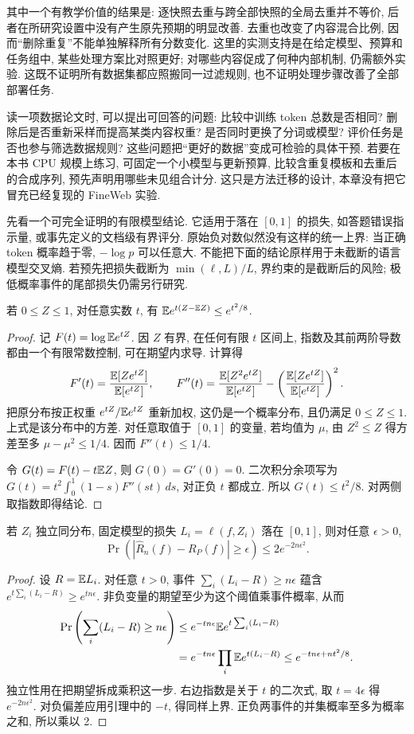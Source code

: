 其中一个有教学价值的结果是: 逐快照去重与跨全部快照的全局去重并不等价, 后者在所研究设置中没有产生原先预期的明显改善. 去重也改变了内容混合比例, 因而“删除重复”不能单独解释所有分数变化. 这里的实测支持是在给定模型、预算和任务组中, 某些处理方案比对照更好; 对哪些内容促成了何种内部机制, 仍需额外实验. 这既不证明所有数据集都应照搬同一过滤规则, 也不证明处理步骤改善了全部部署任务.

读一项数据论文时, 可以提出可回答的问题: 比较中训练 token 总数是否相同? 删除后是否重新采样而提高某类内容权重? 是否同时更换了分词或模型? 评价任务是否也参与筛选数据规则? 这些问题把“更好的数据”变成可检验的具体干预. 若要在本书 CPU 规模上练习, 可固定一个小模型与更新预算, 比较含重复模板和去重后的合成序列, 预先声明用哪些未见组合计分. 这只是方法迁移的设计, 本章没有把它冒充已经复现的 FineWeb 实验.

先看一个可完全证明的有限模型结论. 它适用于落在 $[0,1]$ 的损失, 如答题错误指示量, 或事先定义的文档级有界评分. 原始负对数似然没有这样的统一上界: 当正确 token 概率趋于零, $-\log p$ 可以任意大. 不能把下面的结论原样用于未截断的语言模型交叉熵. 若预先把损失截断为 $\min(\ell,L)/L$, 界约束的是截断后的风险; 极低概率事件的尾部损失仍需另行研究.

\begin{lemma}[有界随机变量的指数估计]
若 $0\le Z\le1$, 对任意实数 $t$, 有 $\mathbb E e^{t(Z-\mathbb E Z)}\le e^{t^2/8}$.
\end{lemma}
\begin{proof}
记 $F(t)=\log\mathbb E e^{tZ}$. 因 $Z$ 有界, 在任何有限 $t$ 区间上, 指数及其前两阶导数都由一个有限常数控制, 可在期望内求导. 计算得
\[
F'(t)=\frac{\mathbb E[Ze^{tZ}]}{\mathbb E[e^{tZ}]},\qquad
F''(t)=\frac{\mathbb E[Z^2e^{tZ}]}{\mathbb E[e^{tZ}]}-
\left(\frac{\mathbb E[Ze^{tZ}]}{\mathbb E[e^{tZ}]}\right)^2.
\]
把原分布按正权重 $e^{tZ}/\mathbb E e^{tZ}$ 重新加权, 这仍是一个概率分布, 且仍满足 $0\le Z\le1$. 上式是该分布中的方差. 对任意取值于 $[0,1]$ 的变量, 若均值为 $\mu$, 由 $Z^2\le Z$ 得方差至多 $\mu-\mu^2\le1/4$. 因而 $F''(t)\le1/4$.

令 $G(t)=F(t)-t\mathbb E Z$, 则 $G(0)=G'(0)=0$. 二次积分余项写为
$G(t)=t^2\int_0^1(1-s)F''(st)\,ds$, 对正负 $t$ 都成立. 所以 $G(t)\le t^2/8$. 对两侧取指数即得结论.
\end{proof}

\begin{theorem}
若 $Z_i$ 独立同分布, 固定模型的损失 $L_i=\ell(f,Z_i)$ 落在 $[0,1]$, 则对任意 $\epsilon>0$,
\[
\Pr\left(\left|\widehat R_n(f)-R_P(f)\right|\ge\epsilon\right)
\le 2e^{-2n\epsilon^2}.
\]
\end{theorem}
\begin{proof}
设 $R=\mathbb E L_i$. 对任意 $t>0$, 事件 $\sum_i(L_i-R)\ge n\epsilon$ 蕴含 $e^{t\sum_i(L_i-R)}\ge e^{tn\epsilon}$. 非负变量的期望至少为这个阈值乘事件概率, 从而
\begin{align*}
\Pr\left(\sum_i(L_i-R)\ge n\epsilon\right)
&\le e^{-tn\epsilon}\mathbb E e^{t\sum_i(L_i-R)}\\
&=e^{-tn\epsilon}\prod_i\mathbb E e^{t(L_i-R)}
\le e^{-tn\epsilon+nt^2/8}.
\end{align*}
独立性用在把期望拆成乘积这一步. 右边指数是关于 $t$ 的二次式, 取 $t=4\epsilon$ 得 $e^{-2n\epsilon^2}$. 对负偏差应用引理中的 $-t$, 得同样上界. 正负两事件的并集概率至多为概率之和, 所以乘以 2.
\end{proof}

